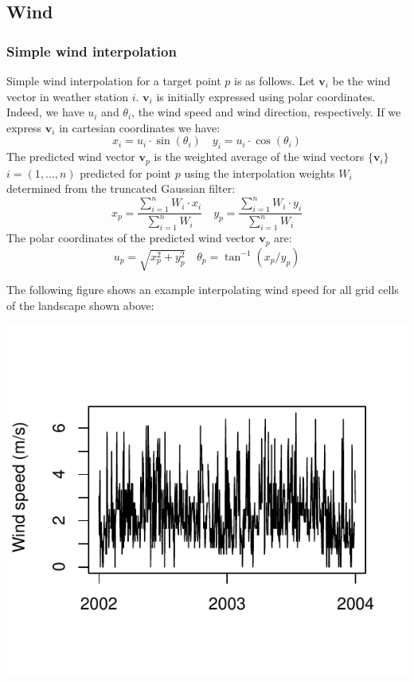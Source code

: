 \documentclass[11pt,a4paper]{article}
\begin{document}
\subsection{Wind}
\subsubsection{Simple wind interpolation}
Simple wind interpolation for a target point $p$ is as follows. Let $\mathbf{v}_{i}$ be the wind vector in weather station $i$. $\mathbf{v}_{i}$ is initially expressed using polar coordinates. Indeed, we have $u_{i}$ and $\theta_{i}$, the wind speed and wind direction, respectively. If we express $\mathbf{v}_{i}$ in cartesian coordinates we have:
\begin{equation}
x_{i} = u_{i}\cdot \sin(\theta_{i}) \quad y_{i} = u_{i}\cdot \cos(\theta_{i})
\end{equation}
The predicted wind vector $\mathbf{v}_{p}$ is the weighted average of the wind vectors $\{\mathbf{v}_{i}\}$  $i=(1,... , n)$ predicted for point $p$ using the interpolation weights $W_i$ determined from the truncated Gaussian filter:
\begin{equation}
x_{p} = \frac{\sum_{i=1}^{n}{W_i \cdot x_{i}}}{\sum_{i=1}^{n}{W_i}}  \quad y_{p} = \frac{\sum_{i=1}^{n}{W_i \cdot y_{i}}}{\sum_{i=1}^{n}{W_i}}
\end{equation}
The polar coordinates of the predicted wind vector $\mathbf{v}_{p}$  are:
\begin{equation}
u_{p} = \sqrt{x^{2}_{p} + y^{2}_{p}} \quad \theta_{p} = \tan^{-1}(x_{p}/y_{p})
\end{equation}

The following figure shows an example interpolating wind speed for all grid cells of the landscape shown above:

\begin{center}
\includegraphics{Meteorology-017}
\end{center}
\end{document}
